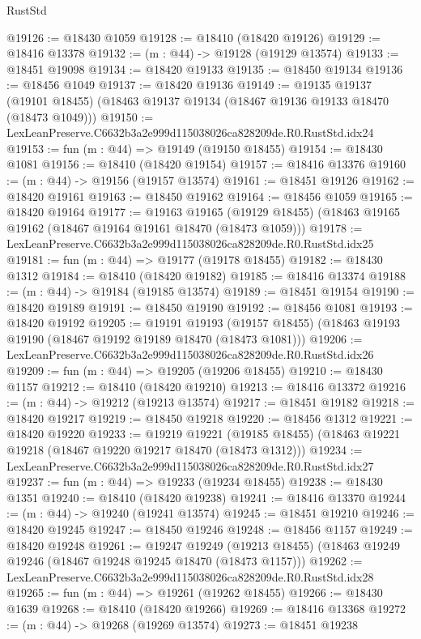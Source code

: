 \begin{lexlean}{RustStd}
\begin{coremodule}
@19126 := @18430 @1059
@19128 := @18410 (@18420 @19126)
@19129 := @18416 @13378
@19132 := (m : @44) -> @19128 (@19129 @13574)
@19133 := @18451 @19098
@19134 := @18420 @19133
@19135 := @18450 @19134
@19136 := @18456 @1049
@19137 := @18420 @19136
@19149 := @19135
    @19137
    (@19101 @18455)
    (@18463 @19137 @19134 (@18467 @19136 @19133 @18470 (@18473 @1049)))
@19150 := LexLeanPreserve.C6632b3a2e999d115038026ca828209de.R0.RustStd.idx24
@19153 := fun (m : @44) => @19149 (@19150 @18455)
@19154 := @18430 @1081
@19156 := @18410 (@18420 @19154)
@19157 := @18416 @13376
@19160 := (m : @44) -> @19156 (@19157 @13574)
@19161 := @18451 @19126
@19162 := @18420 @19161
@19163 := @18450 @19162
@19164 := @18456 @1059
@19165 := @18420 @19164
@19177 := @19163
    @19165
    (@19129 @18455)
    (@18463 @19165 @19162 (@18467 @19164 @19161 @18470 (@18473 @1059)))
@19178 := LexLeanPreserve.C6632b3a2e999d115038026ca828209de.R0.RustStd.idx25
@19181 := fun (m : @44) => @19177 (@19178 @18455)
@19182 := @18430 @1312
@19184 := @18410 (@18420 @19182)
@19185 := @18416 @13374
@19188 := (m : @44) -> @19184 (@19185 @13574)
@19189 := @18451 @19154
@19190 := @18420 @19189
@19191 := @18450 @19190
@19192 := @18456 @1081
@19193 := @18420 @19192
@19205 := @19191
    @19193
    (@19157 @18455)
    (@18463 @19193 @19190 (@18467 @19192 @19189 @18470 (@18473 @1081)))
@19206 := LexLeanPreserve.C6632b3a2e999d115038026ca828209de.R0.RustStd.idx26
@19209 := fun (m : @44) => @19205 (@19206 @18455)
@19210 := @18430 @1157
@19212 := @18410 (@18420 @19210)
@19213 := @18416 @13372
@19216 := (m : @44) -> @19212 (@19213 @13574)
@19217 := @18451 @19182
@19218 := @18420 @19217
@19219 := @18450 @19218
@19220 := @18456 @1312
@19221 := @18420 @19220
@19233 := @19219
    @19221
    (@19185 @18455)
    (@18463 @19221 @19218 (@18467 @19220 @19217 @18470 (@18473 @1312)))
@19234 := LexLeanPreserve.C6632b3a2e999d115038026ca828209de.R0.RustStd.idx27
@19237 := fun (m : @44) => @19233 (@19234 @18455)
@19238 := @18430 @1351
@19240 := @18410 (@18420 @19238)
@19241 := @18416 @13370
@19244 := (m : @44) -> @19240 (@19241 @13574)
@19245 := @18451 @19210
@19246 := @18420 @19245
@19247 := @18450 @19246
@19248 := @18456 @1157
@19249 := @18420 @19248
@19261 := @19247
    @19249
    (@19213 @18455)
    (@18463 @19249 @19246 (@18467 @19248 @19245 @18470 (@18473 @1157)))
@19262 := LexLeanPreserve.C6632b3a2e999d115038026ca828209de.R0.RustStd.idx28
@19265 := fun (m : @44) => @19261 (@19262 @18455)
@19266 := @18430 @1639
@19268 := @18410 (@18420 @19266)
@19269 := @18416 @13368
@19272 := (m : @44) -> @19268 (@19269 @13574)
@19273 := @18451 @19238

\end{coremodule}
\end{lexlean}
